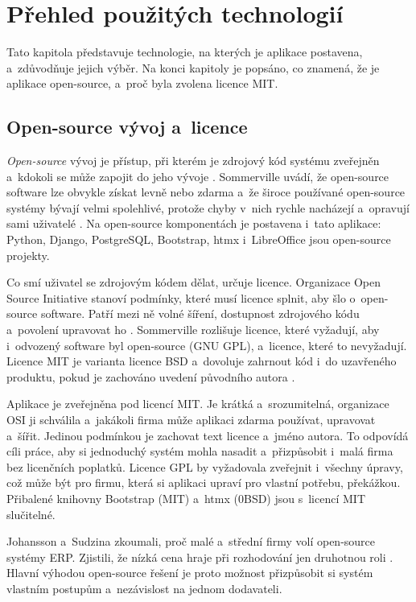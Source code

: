 \chapter{Přehled použitých technologií}\label{kap:technologie}

Tato kapitola představuje technologie, na kterých je aplikace postavena, a~zdůvodňuje jejich výběr. Na konci kapitoly je popsáno, co znamená, že je aplikace open-source, a~proč byla zvolena licence MIT.



\section{Open-source vývoj a~licence}\label{sec:open-source}

\emph{Open-source} vývoj je přístup, při kterém je zdrojový kód systému zveřejněn a~kdokoli se může zapojit do jeho vývoje \cite[s.~219]{Sommerville2016}. Sommerville uvádí, že open-source software lze obvykle získat levně nebo zdarma a~že široce používané open-source systémy bývají velmi spolehlivé, protože chyby v~nich rychle nacházejí a~opravují sami uživatelé \cite[s.~219]{Sommerville2016}. Na open-source komponentách je postavena i~tato aplikace: Python, Django, PostgreSQL, Bootstrap, htmx i~LibreOffice jsou open-source projekty.

Co smí uživatel se zdrojovým kódem dělat, určuje licence. Organizace Open Source Initiative stanoví podmínky, které musí licence splnit, aby šlo o~open-source software. Patří mezi ně volné šíření, dostupnost zdrojového kódu a~povolení upravovat ho \cite{OSI-definice}. Sommerville rozlišuje licence, které vyžadují, aby i~odvozený software byl open-source (GNU GPL), a~licence, které to nevyžadují. Licence MIT je varianta licence BSD a~dovoluje zahrnout kód i~do uzavřeného produktu, pokud je zachováno uvedení původního autora \cite[s.~220--221]{Sommerville2016}.

Aplikace je zveřejněna pod licencí MIT. Je krátká a~srozumitelná, organizace OSI ji schválila a~jakákoli firma může aplikaci zdarma používat, upravovat a~šířit. Jedinou podmínkou je zachovat text licence a~jméno autora. To odpovídá cíli práce, aby si jednoduchý systém mohla nasadit a~přizpůsobit i~malá firma bez licenčních poplatků. Licence GPL by vyžadovala zveřejnit i~všechny úpravy, což může být pro firmu, která si aplikaci upraví pro vlastní potřebu, překážkou. Přibalené knihovny Bootstrap (MIT) a~htmx (0BSD) jsou s~licencí MIT slučitelné.

Johansson a~Sudzina zkoumali, proč malé a~střední firmy volí open-source systémy ERP. Zjistili, že nízká cena hraje při rozhodování jen druhotnou roli \cite{Johansson2008}. Hlavní výhodou open-source řešení je proto možnost přizpůsobit si systém vlastním postupům a~nezávislost na jednom dodavateli.
